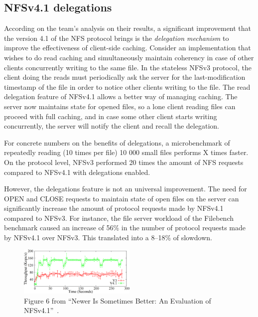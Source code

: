 \subsection{NFSv4.1 delegations}
According on the team's analysis on their results, a significant improvement that the version 4.1 of the NFS protocol brings is the \emph{delegation
mechanism} to improve the effectiveness of client-side caching.
Consider an implementation that wishes to do read caching and simultaneously maintain coherency in case of other clients
concurrently writing to the same file.
In the stateless NFSv3 protocol, the client doing the reads must periodically ask the server for the last-modification timestamp of the file in order to notice other clients writing to the file.
The read delegation feature of NFSv4.1 allows a better way of managing caching.
The server now maintains state for opened files, so a lone client reading files can proceed with full caching,
and in case some other client starts writing concurrently, the server will notify the client and recall the delegation.

For concrete numbers on the benefits of delegations, a microbenchmark of repeatedly reading (10 times per file) 10 000 small files performs X times faster.
On the protocol level, NFSv3 performed 20 times the amount of NFS requests compared to NFSv4.1 with delegations enabled.

However, the delegations feature is not an universal improvement.
The need for OPEN and CLOSE requests to maintain state of open files on the server can significantly increase the amount of protocol requests made by NFSv4.1 compared to NFSv3.
For instance, the file server workload of the Filebench benchmark caused an increase of 56\% in the number of protocol requests made by NFSv4.1 over NFSv3.
This translated into a 8--18\% of slowdown.

\begin{figure}[h]
\centering\includegraphics[width=0.5\textwidth]{images/nfsv41better-reading-small-files.png}
\caption{Figure 6 from ``Newer Is Sometimes Better: An Evaluation of NFSv4.1''~\cite{NFSv4Better}.}
\end{figure}

